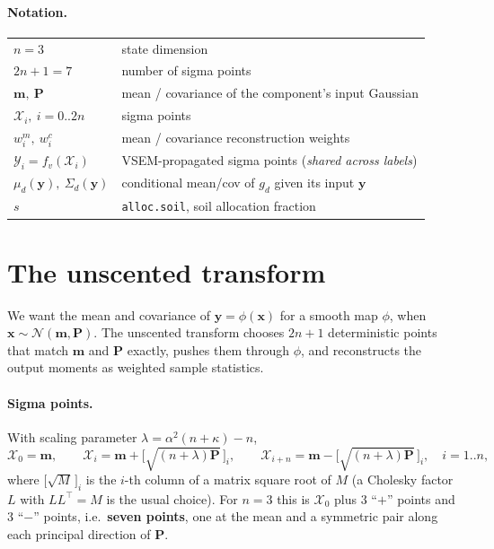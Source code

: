\documentclass[11pt]{article}
\newcommand{\code}[1]{\texttt{#1}}
\newcommand{\bx}{\bm{x}}
\newcommand{\by}{\bm{y}}
\newcommand{\bm}[1]{\boldsymbol{#1}}
\begin{document}
\paragraph{Notation.}
\begin{center}
\begin{tabular}{@{}ll@{}}
\toprule
$n=3$ & state dimension \\
$2n+1=7$ & number of sigma points \\
$\bm m,\ \bm P$ & mean / covariance of the component's input Gaussian \\
$\mathcal X_i,\ i=0..2n$ & sigma points \\
$w_i^m,\ w_i^c$ & mean / covariance reconstruction weights \\
$\mathcal Y_i=f_v(\mathcal X_i)$ & VSEM-propagated sigma points (\emph{shared across labels}) \\
$\mu_d(\by),\ \Sigma_d(\by)$ & conditional mean/cov of $g_d$ given its input $\by$ \\
$s$ & \code{alloc.soil}, soil allocation fraction \\
\bottomrule
\end{tabular}
\end{center}

\section{The unscented transform}
\label{sec:ut}

We want the mean and covariance of $\by=\phi(\bx)$ for a smooth map $\phi$, when
$\bx\sim\mathcal N(\bm m,\bm P)$. The unscented transform
\cite{julier2004,vandermerwe2004,sarkka2013} chooses $2n+1$ deterministic points that
match $\bm m$ and $\bm P$ exactly, pushes them through $\phi$, and reconstructs the output
moments as weighted sample statistics.

\paragraph{Sigma points.} With scaling parameter $\lambda=\alpha^2(n+\kappa)-n$,
\begin{equation}
\label{eq:sigma}
\mathcal X_0=\bm m,\qquad
\mathcal X_i=\bm m+\big[\sqrt{(n+\lambda)\bm P}\,\big]_i,\qquad
\mathcal X_{i+n}=\bm m-\big[\sqrt{(n+\lambda)\bm P}\,\big]_i,\quad i=1..n,
\end{equation}
where $\big[\sqrt{M}\,\big]_i$ is the $i$-th column of a matrix square root of $M$
(a Cholesky factor $L$ with $LL^\top=M$ is the usual choice). For $n=3$ this is
$\mathcal X_0$ plus $3$ ``$+$'' points and $3$ ``$-$'' points, i.e.\ \textbf{seven points},
one at the mean and a symmetric pair along each principal direction of $\bm P$.
\end{document}
